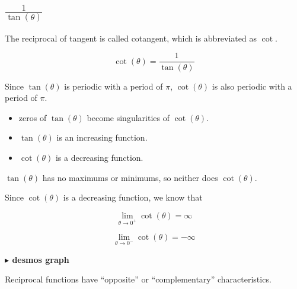 \documentclass{ximera}
\begin{document}
\subsection*{$\frac{1}{\tan(\theta)}$}


The reciprocal of tangent is called cotangent, which is abbreviated as $\cot$.


\[
\cot(\theta) = \frac{1}{\tan(\theta)}
\]


Since $\tan(\theta)$ is periodic with a period of $\pi$, $\cot(\theta)$ is also periodic with a period of $\pi$.



\begin{itemize}
\item zeros of $\tan(\theta)$ become singularities of $\cot(\theta)$.
\end{itemize}




\begin{itemize}
\item $\tan(\theta)$ is an increasing function.
\item $\cot(\theta)$ is a decreasing function.
\end{itemize}


$\tan(\theta)$ has no maximums or minimums, so neither does $\cot(\theta)$.



Since $\cot(\theta)$ is a decreasing function, we know that

\[
\lim\limits_{\theta \to 0^+} \cot(\theta) = \infty
\]




\[
\lim\limits_{\theta \to 0^-} \cot(\theta) = -\infty
\]












\textbf{\textcolor{blue!55!black}{$\blacktriangleright$ desmos graph}} 
\begin{center}
\end{center}


Reciprocal functions have ``opposite'' or ``complementary'' characteristics.
\end{document}
